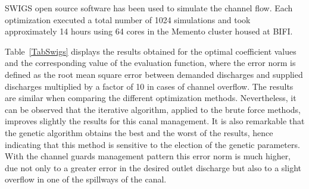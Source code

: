 \documentclass[review,authoryear]{elsarticle}
\begin{document}
SWIGS open source software \citep{Swigs} has been used to simulate the channel
flow. Each optimization executed a total number of 1024 simulations and took 
approximately 14 hours using 64 cores in the Memento cluster housed at BIFI.

Table~\ref{TabSwigs} displays the results obtained for the optimal coefficient
values and the corresponding value of the evaluation function, where the error
norm is defined as the root mean square error between demanded discharges and
supplied discharges multiplied by a factor of 10 in cases of channel overflow.
The results are similar when comparing the different optimization methods.
Nevertheless, it can be observed that the iterative algorithm, applied to the 
brute force methods, improves slightly the results for this canal management.
It is also remarkable that the genetic algorithm obtains the best
and the worst of the results, hence indicating that this method
is sensitive to the election of the genetic parameters. With the channel
guards management pattern this error norm is much higher, due not only to a greater error
in the desired outlet discharge but also to a slight overflow in one of the 
spillways of the canal.
\end{document}
